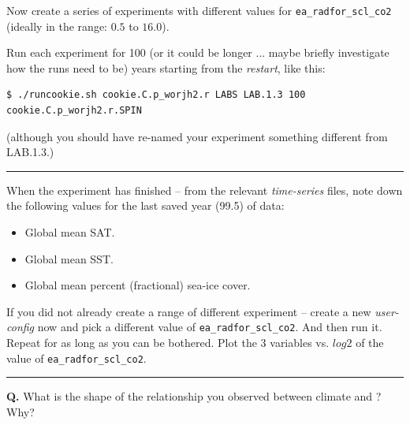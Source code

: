 \noindent Now create a series of experiments with different values for \texttt{\small ea\_radfor\_scl\_co2} (ideally in the range: $0.5$ to $16.0$).

Run each experiment for 100 (or it could be longer ... maybe briefly investigate how the runs need to be) years starting from the \textit{restart}, like this:

\vspace{-2mm}\small\begin{verbatim}
$ ./runcookie.sh cookie.C.p_worjh2.r LABS LAB.1.3 100 cookie.C.p_worjh2.r.SPIN
\end{verbatim}\normalsize\vspace{-2mm}

\noindent (although you should have re-named your experiment something different from \textsf{\footnotesize LAB.1.3}.)

\vspace{1mm}\noindent\rule{4cm}{0.5pt}\vspace{2mm}

\newpage

\noindent When the experiment has finished -- from the relevant \textit{time-series} files, note down the following values for the last saved year (99.5) of data:

\vspace{1mm}
\begin{itemize}[noitemsep]
\setlength{\itemindent}{.2in}
\item Global mean SAT.
\item Global mean SST.
\item Global mean percent (fractional) sea-ice cover.
\end{itemize}

\vspace{1mm}
If you did not already create a range of different experiment -- create a new \textit{user-config} now and pick a different value of \texttt{\small ea\_radfor\_scl\_co2}. And then run it. Repeat for as long as you can be bothered. Plot the 3 variables vs. $log2$ of the value of \texttt{\small ea\_radfor\_scl\_co2}.

\vspace{1mm}\noindent\rule{4cm}{0.5pt}\vspace{2mm}

\noindent \textbf{Q.} What is the shape of the relationship you observed between climate and ? Why?

